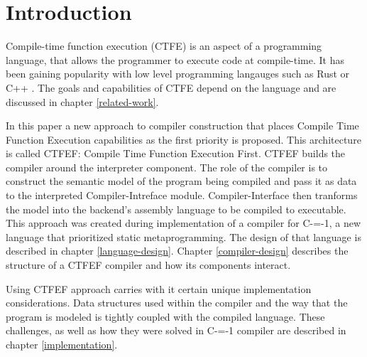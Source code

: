 \section{Introduction}


Compile-time function execution (CTFE) is an aspect of a programming language, that allows the programmer to execute code at compile-time.
It has been gaining popularity with low level programming langauges such as Rust \cite{rust} or C++ \cite{ISO:cpp98}.
The goals and capabilities of CTFE depend on the language and are discussed in chapter \ref{related-work}.

In this paper a new approach to compiler construction that places Compile Time Function Execution capabilities as the first priority is proposed.
This architecture is called CTFEF: Compile Time Function Execution First.
CTFEF builds the compiler around the interpreter component.
The role of the compiler is to construct the semantic model of the program being compiled and pass it as data to the interpreted Compiler-Intreface module.
Compiler-Interface then tranforms the model into the backend's assembly language to be compiled to executable.
This approach was created during implementation of a compiler for C-=-1, a new language that prioritized static metaprogramming.
The design of that language is described in chapter \ref{language-design}.
Chapter \ref{compiler-design} describes the structure of a CTFEF compiler and how its components interact.

Using CTFEF approach carries with it certain unique implementation considerations.
Data structures used within the compiler and the way that the program is modeled is tightly coupled with the compiled language.
These challenges, as well as how they were solved in C-=-1 compiler are described in chapter \ref{implementation}.
